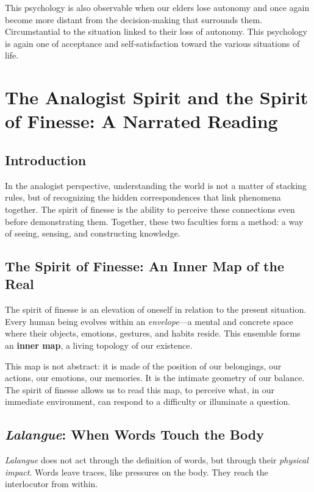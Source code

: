 \documentclass[12pt,oneside]{article}
\begin{document}
This psychology is also observable when our elders lose autonomy and once again become more distant from the decision‑making that surrounds them. Circumstantial to the situation linked to their loss of autonomy. This psychology is again one of acceptance and self‑satisfaction toward the various situations of life.

\section{The Analogist Spirit and the Spirit of Finesse: A Narrated Reading}

\subsection{Introduction}

In the analogist perspective, understanding the world is not a matter of stacking rules, but of recognizing the hidden correspondences that link phenomena together. The spirit of finesse is the ability to perceive these connections even before demonstrating them. Together, these two faculties form a method: a way of seeing, sensing, and constructing knowledge.

\subsection{The Spirit of Finesse: An Inner Map of the Real}

The spirit of finesse is an elevation of oneself in relation to the present situation. Every human being evolves within an \emph{envelope}—a mental and concrete space where their objects, emotions, gestures, and habits reside. This ensemble forms an \textbf{inner map}, a living topology of our existence.

This map is not abstract: it is made of the position of our belongings, our actions, our emotions, our memories. It is the intimate geometry of our balance. The spirit of finesse allows us to read this map, to perceive what, in our immediate environment, can respond to a difficulty or illuminate a question.

\subsection{\textit{Lalangue}: When Words Touch the Body}

\textit{Lalangue} does not act through the definition of words, but through their \emph{physical impact}.  
Words leave traces, like pressures on the body. They reach the interlocutor from within.
\end{document}
